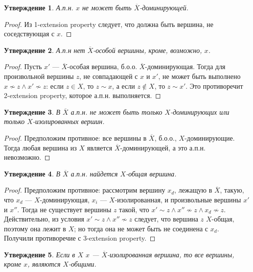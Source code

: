 \documentclass{article}
\newtheorem*{sttm}{Утверждение}
\begin{document}
	\begin{sttm}
		А.п.н. $x$ не может быть $\overline{X}$-доминирующей.
	\end{sttm}
	
	\begin{proof}
		Из 1-extension property следует, что должна быть вершина, не соседствующая с $x$. 
	\end{proof}
	
	\begin{sttm}
		А.п.н нет $\overline{X}$-особой вершины, кроме, возможно, $x$.
	\end{sttm}
	
	\begin{proof}
		Пусть $x'$ --- $\overline{X}$-особая вершина, б.о.о. $\overline{X}$-доминирующая. Тогда для произвольной вершины $z$, не совпадающей с $x$ и $x'$, не может быть выполнено $x \nsim z \land x' \nsim z$: если $z \in X$, то $z \sim x$, а если $z \notin X$, то $z \sim x'$. Это противоречит 2-extension property, которое а.п.н. выполняется.
	\end{proof}
	
	\begin{sttm}
		В $\overline{X}$ а.п.н. не может быть только $X$-доминирующих или только $X$-изолированных вершин.
	\end{sttm}
	
	\begin{proof}
		Предположим противное: все вершины в $\overline{X}$, б.о.о., $X$-доминирующие. Тогда любая вершина из $X$ является $\overline{X}$-доминирующей, а это а.п.н. невозможно.
	\end{proof}
	
	
	\begin{sttm}
		В $\overline{X}$ а.п.н. найдется $X$-общая вершина.
	\end{sttm}
	
	\begin{proof}
		Предположим противное: рассмотрим вершину $x_d$, лежащую в $\overline{X}$, такую, что $x_d$ --- $X$-доминирующая, $x_i$ --- $X$-изолированная, и произвольные вершины $x'$ и $x''$. Тогда не существует вершины $z$ такой, что $x' \sim z \land x'' \nsim z \land x_d \nsim z$. Действительно, из условия $x' \sim z \land x'' \nsim z$ следует, что вершина $z$ $X$-общая, поэтому она лежит в $X$; но тогда она не может быть не соединена с $x_d$. Получили противоречие с 3-extension property.
	\end{proof}		
	
	\begin{sttm}
		Если в $X$ $x$ --- $\overline{X}$-изолированная вершина, то все вершины, кроме $x$, являются $X$-общими. 
	\end{sttm}
	
\end{document}
